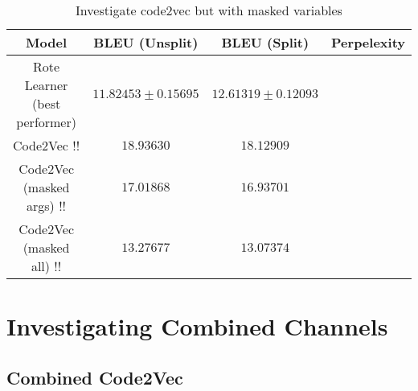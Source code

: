 \begin{table}[ht!]
\begin{center}
\begin{tabular}{ c | c | c | c }
    Model                             & BLEU (Unsplit)  & BLEU (Split)    & Perpelexity \\
    \hline
    Rote Learner (best performer)          & $ 11.82453 \pm  0.15695 $ & $ 12.61319 \pm 0.12093 $ & \\
    \hline
    Code2Vec                !!              & $ 18.93630 $ & $ 18.12909 $ & \\
    Code2Vec (masked args)  !!              & $ 17.01868 $ & $ 16.93701 $ & \\                  
    Code2Vec (masked all)   !!               & $ 13.27677 $ & $ 13.07374 $ & \\

    \hline
\end{tabular}
\caption {Investigate code2vec but with masked variables}
\label{table:code_2_vec_masked}
\end{center}
\end{table}


\section{Investigating Combined Channels} %
\label{sec:investigating_combined_channels}


\subsection{Combined Code2Vec } %
\label{sub:combined_code2vec}


